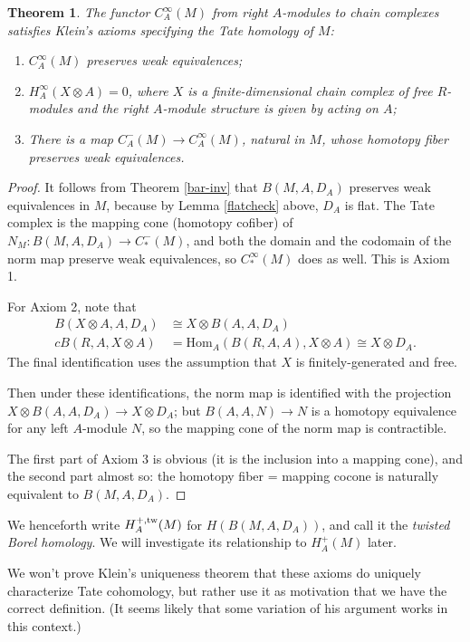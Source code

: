 \documentclass{memo-l}
\newtheorem{theorem}{Theorem}[chapter]
\theoremstyle{definition}
\theoremstyle{remark}
\numberwithin{section}{chapter}
\numberwithin{equation}{chapter}
\begin{document}
\begin{theorem}The functor $C^\infty_A(M)$ from right $A$-modules to chain complexes satisfies Klein's axioms specifying the Tate homology of $M$: \begin{enumerate}
    \item $C^\infty_A(M)$ preserves weak equivalences;
    \item $H^\infty_A(X \otimes A) = 0$, where $X$ is a finite-dimensional chain complex of free $R$-modules and the right $A$-module structure is given by acting on $A$;
    \item There is a map $C^-_A(M) \to C^\infty_A(M)$, natural in $M$, whose homotopy fiber preserves weak equivalences. 
    \end{enumerate}
\end{theorem}

\begin{proof}
It follows from Theorem \ref{bar-inv} that $B(M, A, D_A)$ preserves weak equivalences in $M$, because by Lemma \ref{flatcheck} above, $D_A$ is flat. The Tate complex is the mapping cone (homotopy cofiber) of $N_M: B(M, A, D_A) \to C_*^-(M)$, and both the domain and the codomain of the norm map preserve weak equivalences, so $C_*^\infty(M)$ does as well. This is Axiom 1.

For Axiom 2, note that 
\begin{align*}B(X \otimes A, A, D_A) &\cong X \otimes B(A, A, D_A) \\
cB(R, A, X \otimes A) &= \text{Hom}_A(B(R,A,A), X \otimes A) \cong X \otimes D_A.\end{align*} 
The final identification uses the assumption that $X$ is finitely-generated and free. 
 
Then under these identifications, the norm map is identified with the projection $X \otimes B(A, A, D_A) \to X \otimes D_A$; but $B(A,A,N) \to N$ is a homotopy equivalence for any left $A$-module $N$, so the mapping cone of the norm map is contractible.

The first part of Axiom 3 is obvious (it is the inclusion into a mapping cone), and the second part almost so: the homotopy fiber = mapping cocone is naturally equivalent to $B(M, A, D_A)$.\end{proof}

We henceforth write $H^{+,\textup{tw}}_A(M)$ for $H(B(M, A, D_A))$, and call it the \emph{twisted Borel homology}. We will investigate its relationship to $H^+_A(M)$ later. 

We won't prove Klein's uniqueness theorem that these axioms do uniquely characterize Tate cohomology, but rather use it as motivation that we have the correct definition. (It seems likely that some variation of his argument works in this context.)
\end{document}
